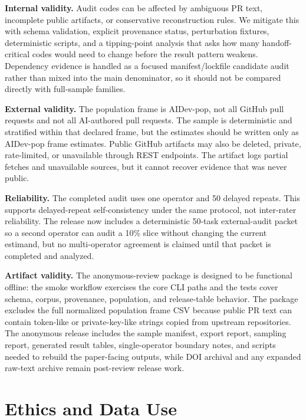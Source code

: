 \documentclass[10pt,conference]{IEEEtran}
\begin{document}
\textbf{Internal validity.}
Audit codes can be affected by ambiguous PR text, incomplete public artifacts, or conservative reconstruction rules.
We mitigate this with schema validation, explicit provenance status, perturbation fixtures, deterministic scripts, and a tipping-point analysis that asks how many handoff-critical codes would need to change before the result pattern weakens.
Dependency evidence is handled as a focused manifest/lockfile candidate audit rather than mixed into the main denominator, so it should not be compared directly with full-sample families.

\textbf{External validity.}
The population frame is AIDev-pop, not all GitHub pull requests and not all AI-authored pull requests.
The sample is deterministic and stratified within that declared frame, but the estimates should be written only as AIDev-pop frame estimates.
Public GitHub artifacts may also be deleted, private, rate-limited, or unavailable through REST endpoints.
The artifact logs partial fetches and unavailable sources, but it cannot recover evidence that was never public.

\textbf{Reliability.}
The completed audit uses one operator and 50 delayed repeats.
This supports delayed-repeat self-consistency under the same protocol, not inter-rater reliability.
The release now includes a deterministic 50-task external-audit packet so a second operator can audit a 10\% slice without changing the current estimand, but no multi-operator agreement is claimed until that packet is completed and analyzed.

\textbf{Artifact validity.}
The anonymous-review package is designed to be functional offline: the smoke workflow exercises the core CLI paths and the tests cover schema, corpus, provenance, population, and release-table behavior.
The package excludes the full normalized population frame CSV because public PR text can contain token-like or private-key-like strings copied from upstream repositories.
The anonymous release includes the sample manifest, export report, sampling report, generated result tables, single-operator boundary notes, and scripts needed to rebuild the paper-facing outputs, while DOI archival and any expanded raw-text archive remain post-review release work.

\section{Ethics and Data Use}
\end{document}
